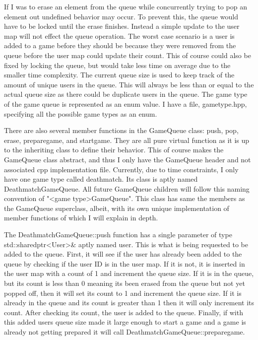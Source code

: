 \documentclass[conference]{IEEEtran}
\begin{document}
If I was to erase an element from the queue while concurrently trying to pop an element out undefined behavior may occur.
To prevent this, the queue would have to be locked until the erase finishes.
Instead a simple update to the user map will not effect the queue operation.
The worst case scenario is a user is added to a game before they should be because they were removed from the queue before the user map could update their count.
This of course could also be fixed by locking the queue, but would take less time on average due to the smaller time complexity.
The current queue size is used to keep track of the amount of unique users in the queue.
This will always be less than or equal to the actual queue size as there could be duplicate users in the queue.
The game type of the game queue is represented as an enum value.
I have a file, game\textunderscore type.hpp, specifying all the possible game types as an enum. \par
There are also several member functions in the GameQueue class: push, pop, erase, prepare\textunderscore game, and start\textunderscore game.
They are all pure virtual function as it is up to the inheriting class to define their behavior.
This of course makes the GameQueue class abstract, and thus I only have the GameQueue header and not associated cpp implementation file.
Currently, due to time constraints,  I only have one game type called deathmatch.
Its class is aptly named DeathmatchGameQueue.
All future GameQueue children will follow this naming convention of "<game type>GameQueue".
This class has same the members as the GameQueue superclass, albeit, with its own unique implementation of member functions of which I will explain in depth. \par
The DeathmatchGameQueue::push function has a single parameter of type std::shared\textunderscore ptr<User>& aptly named user.
This is what is being requested to be added to the queue.
First, it will see if the user has already been added to the queue by checking if the user ID is in the user map.
If it is not, it is inserted in the user map with a count of 1 and increment the queue size.
If it is in the queue, but its count is less than 0 meaning its been erased from the queue but not yet popped off, then it will set its count to 1 and increment the queue size.
If it is already in the queue and its count is greater than 1 then it will only increment its count. 
After checking its count, the user is added to the queue.
Finally, if with this added users queue size made it large enough to start a game and a game is already not getting prepared it will call DeathmatchGameQueue::prepare\textunderscore game. \par
\end{document}
